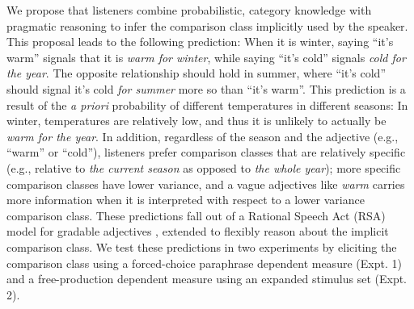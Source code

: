 \documentclass[letterpaper, 12pt]{article}
\begin{document}
We propose that listeners combine probabilistic, category knowledge with pragmatic reasoning to infer the comparison class implicitly used by the speaker. 
This proposal leads to the following prediction: When it is winter, saying \enquote{it's warm} signals that it is \emph{warm for winter}, while saying \enquote{it's cold} signals \emph{cold for the year}. 
The opposite relationship should hold in summer, where \enquote{it's cold} should signal it's cold \emph{for summer} more so than \enquote{it's warm}. 
This prediction is a result of the \emph{a priori} probability of different temperatures in different seasons: In winter, temperatures are relatively low, and thus it is unlikely to actually be \emph{warm for the year}. 
In addition, regardless of the season and the adjective (e.g., \enquote{warm} or \enquote{cold}), listeners prefer comparison classes that are relatively specific (e.g., relative to \emph{the current season} as opposed to \emph{the whole year}); more specific comparison classes have lower variance, and a vague adjectives like \emph{warm} carries more information when it is interpreted with respect to a lower variance comparison class. 
These predictions fall out of a Rational Speech Act (RSA) model for gradable adjectives \cite{Lassiter2015}, extended to flexibly reason about the implicit comparison class. 
We test these predictions in two experiments by eliciting the comparison class using a forced-choice paraphrase dependent measure (Expt. 1) and a free-production dependent measure using an expanded stimulus set (Expt. 2).




\end{document}
